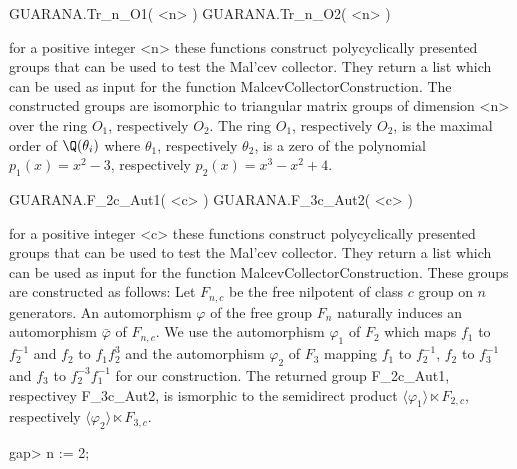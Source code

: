 \> GUARANA.Tr_n_O1( <n> )
\> GUARANA.Tr_n_O2( <n> )

for a positive integer <n> 
these functions construct polycyclically presented groups 
that can be used to test the Mal'cev collector.
They return a list which can be used as input for the function
MalcevCollectorConstruction.
The constructed groups are isomorphic to triangular matrix groups
of dimension <n> over the ring $O_1$, respectively $O_2$.
The ring $O_1$, respectively $O_2$, is the maximal order of 
$\Q(\theta_i)$ where
$\theta_1$, respectively $\theta_2$, is a zero of the polynomial 
$p_1(x) = x^2-3$, respectively 
$p_2(x)=x^3 -x^2 +4$.

\> GUARANA.F_2c_Aut1(  <c> )
\> GUARANA.F_3c_Aut2(  <c> )

for a positive integer <c> 
these functions construct polycyclically presented groups
that can be used to test the Mal'cev collector.
They return a list which can be used as input for the function
MalcevCollectorConstruction.
These groups are constructed as follows:
Let $F_{n,c}$ be the free nilpotent of class $c$ group on $n$ generators.
An automorphism $\varphi$ of the free group $F_n$ naturally induces
an automorphism
$\bar{\varphi}$ of $F_{n,c}$.
We use the automorphism $\varphi_1$ of $F_2$
which maps $f_1$ to $f_2^{-1}$ and $f_2$ to $f_1 f_2^3$
and the automorphism $\varphi_2$ of $F_3$ mapping
$f_1$ to $f_2^{-1}$, $f_2$ to $f_3^{-1}$ and $f_3$ to $f_2^{-3}f_1^{-1}$
for our construction.
The returned group F_2c_Aut1, respectivey F_3c_Aut2, is 
ismorphic to the semidirect product 
 $\langle \varphi_1 \rangle \ltimes F_{2,c}$, respectively
 $\langle \varphi_2 \rangle \ltimes F_{3,c}$.




\beginexample
gap> n := 2;
\endexample



